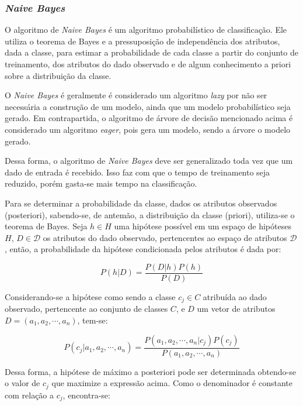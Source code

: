 \documentclass{article}
\begin{document}
\subsubsection{{\b \it Naive Bayes}}

O algoritmo de {\it Naive Bayes} é um algoritmo probabilístico de classificação.
Ele utiliza o teorema de Bayes e a pressuposição de independência dos atributos, dada a classe,
para estimar a probabilidade de cada classe a partir do conjunto de treinamento,
dos atributos do dado observado e de algum conhecimento a priori sobre a distribuição da classe.

O {\it Naive Bayes} é geralmente é considerado um algoritmo {\it lazy} por não ser necessária a construção de um modelo,
ainda que um modelo probabilístico seja gerado.
Em contrapartida, o algoritmo de árvore de decisão mencionado acima é considerado um algoritmo {\it eager}, pois gera um modelo, sendo a árvore o modelo gerado.

Dessa forma, o algoritmo de {\it Naive Bayes} deve ser generalizado toda vez que um dado de entrada é recebido.
Isso faz com que o tempo de treinamento seja reduzido, porém gasta-se mais tempo na classificação.

Para se determinar a probabilidade da classe, dados os atributos observados (posteriori),
sabendo-se, de antemão, a distribuição da classe (priori), utiliza-se o teorema de Bayes.
Seja $h \in H$ uma hipótese possível em um espaço de hipóteses $H$,
$D \in \mathcal{D}$ os atributos do dado observado, pertencentes ao espaço de atributos $\mathcal{D}$,
então, a probabilidade da hipótese condicionada pelos atributos é dada por:

\begin{equation}
P(h|D) = \frac{P(D|h) P(h)}{P(D)}
\end{equation}

Considerando-se a hipótese como sendo a classe $c_j \in C$
atribuída ao dado observado, pertencente ao conjunto de classes $C$, e $D$ um vetor de atributos $D = (a_1,a_2,\cdots,a_n)$, tem-se:

\begin{equation}
P(c_j|a_1,a_2,\cdots,a_n) = \frac{P(a_1,a_2,\cdots,a_n|c_j) P(c_j)}{P(a_1,a_2,\cdots,a_n)}
\end{equation}

Dessa forma, a hipótese de máximo a posteriori pode ser determinada obtendo-se o valor de $c_j$ que maximize a expressão acima.
Como o denominador é constante com relação a $c_j$, encontra-se:
\end{document}

